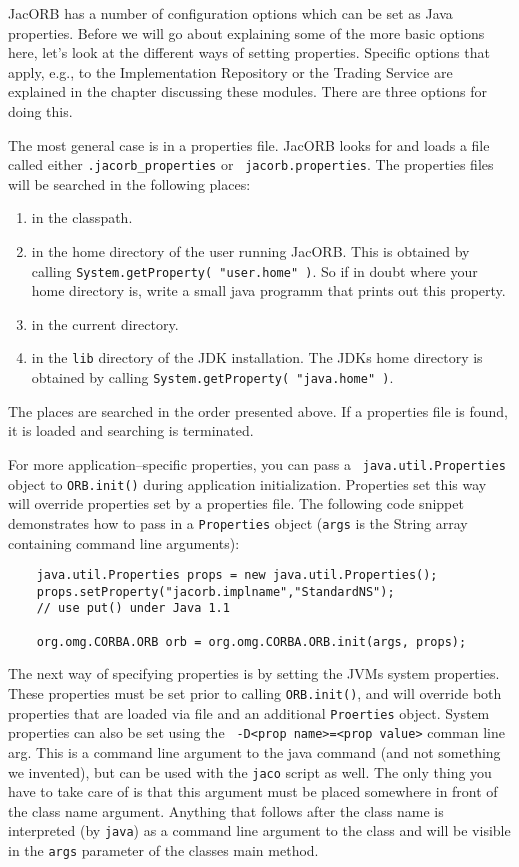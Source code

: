 \documentclass[12pt]{scrbook}
\begin{document}
JacORB has a number of configuration  options which can be set as Java
properties.  Before we will go about explaining some of the more basic
options   here,  let's  look   at  the   different  ways   of  setting
properties. Specific  options that apply, e.g.,  to the Implementation
Repository  or  the  Trading  Service  are explained  in  the  chapter
discussing these modules. There are three options for doing this.

The most  general case is in  a properties file. JacORB  looks for and
loads  a   file  called  either  {\tt   .jacorb\_properties}  or  {\tt
jacorb.properties}. The properties files will be searched in the
following places:
\begin{enumerate}
  \item in the classpath.
  \item in the home directory of the user running JacORB. This is
        obtained by calling {\tt System.getProperty( "user.home" )}.
        So if in doubt where your home directory is, write a small
        java programm that prints out this property.
  \item in the current directory.
  \item in the {\tt lib} directory of the JDK installation. The JDKs
        home directory is obtained by calling 
        {\tt System.getProperty( "java.home" )}.
\end{enumerate}

The places are searched in the order presented above. If a properties
file is found, it is loaded and searching is terminated. 

For  more  application--specific  properties,  you  can  pass  a  {\tt
  java.util.Properties} object to  {\tt ORB.init()} during application
  initialization. Properties set this way will override properties set
  by a properties file. The following code snippet demonstrates how to
  pass in  a {\tt Properties} object  ({\tt args} is  the String array
  containing command line arguments):

\small{
\begin{verbatim}            
    java.util.Properties props = new java.util.Properties();
    props.setProperty("jacorb.implname","StandardNS"); 
    // use put() under Java 1.1

    org.omg.CORBA.ORB orb = org.omg.CORBA.ORB.init(args, props);
\end{verbatim}
}

The next way of specifying properties is by setting the JVMs system
properties.  These properties must be set prior to calling {\tt ORB.init()},
and will override both properties that are loaded via file and an additional
{\tt Proerties} object.  System properties can also be set using the {\tt
  -D<prop name>=<prop value>} comman line arg. This is a command line argument
to the java command (and not something we invented), but can be used with the
{\tt jaco} script as well. The only thing you have to take care of is that
this argument must be placed somewhere in front of the class name argument.
Anything that follows after the class name is interpreted (by {\tt java}) as a
command line argument to the class and will be visible in the {\tt args}
parameter of the classes main method.
\end{document}
